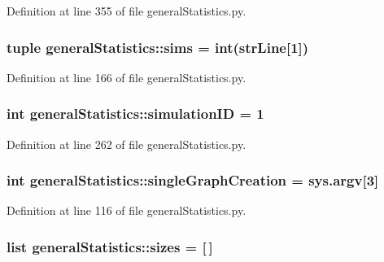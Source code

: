 \-Definition at line 355 of file general\-Statistics.\-py.

\hypertarget{namespacegeneral_statistics_ab1c429f24e411b4f961a86e7a3f53cf1}{
\subsubsection[{sims}]{\setlength{\rightskip}{0pt plus 5cm}tuple {\bf general\-Statistics\-::sims} = int({\bf str\-Line}\mbox{[}1\mbox{]})}}\label{namespacegeneral_statistics_ab1c429f24e411b4f961a86e7a3f53cf1}


\-Definition at line 166 of file general\-Statistics.\-py.

\hypertarget{namespacegeneral_statistics_a6f463c2d878793522d2ac91f1aaa8bc2}{
\subsubsection[{simulation\-I\-D}]{\setlength{\rightskip}{0pt plus 5cm}int {\bf general\-Statistics\-::simulation\-I\-D} = 1}}\label{namespacegeneral_statistics_a6f463c2d878793522d2ac91f1aaa8bc2}


\-Definition at line 262 of file general\-Statistics.\-py.

\hypertarget{namespacegeneral_statistics_ab5f0084f0bffc62955b6478be2d9c9b2}{
\subsubsection[{single\-Graph\-Creation}]{\setlength{\rightskip}{0pt plus 5cm}int {\bf general\-Statistics\-::single\-Graph\-Creation} = sys.\-argv\mbox{[}3\mbox{]}}}\label{namespacegeneral_statistics_ab5f0084f0bffc62955b6478be2d9c9b2}


\-Definition at line 116 of file general\-Statistics.\-py.

\hypertarget{namespacegeneral_statistics_a2ddfeb15247fcd76c5799776c251d274}{
\subsubsection[{sizes}]{\setlength{\rightskip}{0pt plus 5cm}list {\bf general\-Statistics\-::sizes} = \mbox{[}$\,$\mbox{]}}}\label{namespacegeneral_statistics_a2ddfeb15247fcd76c5799776c251d274}


